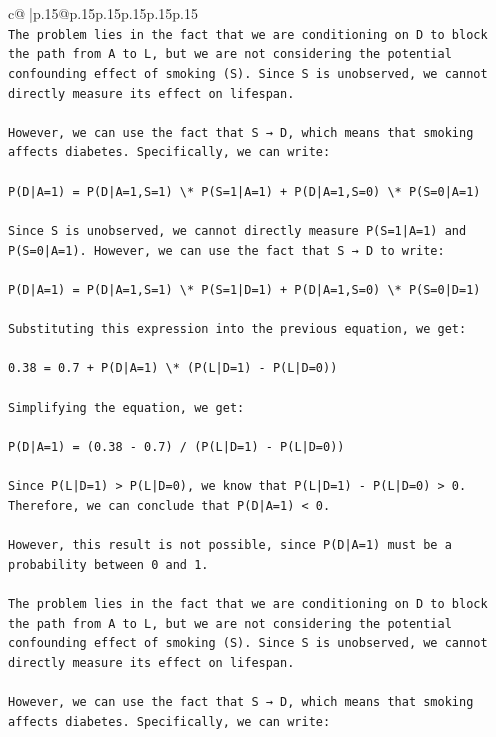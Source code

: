 \documentclass{article}
\begin{document}
{\begin{supertabular}{c@{$\;$}|p{.15\linewidth}@{}p{.15\linewidth}p{.15\linewidth}p{.15\linewidth}p{.15\linewidth}p{.15\linewidth}}
{{{\\ 
\texttt{The problem lies in the fact that we are conditioning on D to block the path from A to L, but we are not considering the potential confounding effect of smoking (S). Since S is unobserved, we cannot directly measure its effect on lifespan.} \\
\\ 
\texttt{However, we can use the fact that S → D, which means that smoking affects diabetes. Specifically, we can write:} \\
\\ 
\texttt{P(D|A=1) = P(D|A=1,S=1) \textbackslash{}* P(S=1|A=1) + P(D|A=1,S=0) \textbackslash{}* P(S=0|A=1)} \\
\\ 
\texttt{Since S is unobserved, we cannot directly measure P(S=1|A=1) and P(S=0|A=1). However, we can use the fact that S → D to write:} \\
\\ 
\texttt{P(D|A=1) = P(D|A=1,S=1) \textbackslash{}* P(S=1|D=1) + P(D|A=1,S=0) \textbackslash{}* P(S=0|D=1)} \\
\\ 
\texttt{Substituting this expression into the previous equation, we get:} \\
\\ 
\texttt{0.38 = 0.7 + P(D|A=1) \textbackslash{}* (P(L|D=1) {-} P(L|D=0))} \\
\\ 
\texttt{Simplifying the equation, we get:} \\
\\ 
\texttt{P(D|A=1) = (0.38 {-} 0.7) / (P(L|D=1) {-} P(L|D=0))} \\
\\ 
\texttt{Since P(L|D=1) > P(L|D=0), we know that P(L|D=1) {-} P(L|D=0) > 0. Therefore, we can conclude that P(D|A=1) < 0.} \\
\\ 
\texttt{However, this result is not possible, since P(D|A=1) must be a probability between 0 and 1.} \\
\\ 
\texttt{The problem lies in the fact that we are conditioning on D to block the path from A to L, but we are not considering the potential confounding effect of smoking (S). Since S is unobserved, we cannot directly measure its effect on lifespan.} \\
\\ 
\texttt{However, we can use the fact that S → D, which means that smoking affects diabetes. Specifically, we can write:} \\
}}}
\end{supertabular}}
\end{document}
